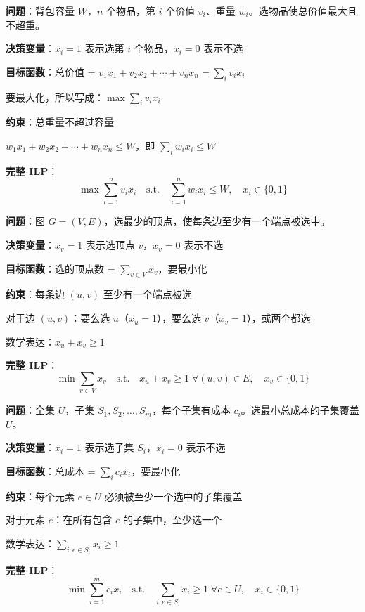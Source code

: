 \documentclass[12pt, a4paper]{ctexart}
\begin{document}
\begin{blackboard}

\textbf{问题}：背包容量 $W$，$n$ 个物品，第 $i$ 个价值 $v_i$、重量 $w_i$。选物品使总价值最大且不超重。

\textbf{决策变量}：$x_i = 1$ 表示选第 $i$ 个物品，$x_i = 0$ 表示不选

\textbf{目标函数}：总价值 = $v_1 x_1 + v_2 x_2 + \cdots + v_n x_n = \sum_i v_i x_i$

要最大化，所以写成：$\max \sum_i v_i x_i$

\textbf{约束}：总重量不超过容量

$w_1 x_1 + w_2 x_2 + \cdots + w_n x_n \leq W$，即 $\sum_i w_i x_i \leq W$

\textbf{完整 ILP}：
\[
\max \sum_{i=1}^n v_i x_i \quad \text{s.t.} \quad \sum_{i=1}^n w_i x_i \leq W, \quad x_i \in \{0, 1\}
\]

\end{blackboard}

\begin{blackboard}

\textbf{问题}：图 $G = (V, E)$，选最少的顶点，使每条边至少有一个端点被选中。

\textbf{决策变量}：$x_v = 1$ 表示选顶点 $v$，$x_v = 0$ 表示不选

\textbf{目标函数}：选的顶点数 = $\sum_{v \in V} x_v$，要最小化

\textbf{约束}：每条边 $(u, v)$ 至少有一个端点被选

对于边 $(u, v)$：要么选 $u$（$x_u = 1$），要么选 $v$（$x_v = 1$），或两个都选

数学表达：$x_u + x_v \geq 1$

\textbf{完整 ILP}：
\[
\min \sum_{v \in V} x_v \quad \text{s.t.} \quad x_u + x_v \geq 1 \; \forall (u,v) \in E, \quad x_v \in \{0, 1\}
\]

\end{blackboard}

\begin{blackboard}

\textbf{问题}：全集 $U$，子集 $S_1, S_2, \ldots, S_m$，每个子集有成本 $c_i$。选最小总成本的子集覆盖 $U$。

\textbf{决策变量}：$x_i = 1$ 表示选子集 $S_i$，$x_i = 0$ 表示不选

\textbf{目标函数}：总成本 = $\sum_i c_i x_i$，要最小化

\textbf{约束}：每个元素 $e \in U$ 必须被至少一个选中的子集覆盖

对于元素 $e$：在所有包含 $e$ 的子集中，至少选一个

数学表达：$\sum_{i: e \in S_i} x_i \geq 1$

\textbf{完整 ILP}：
\[
\min \sum_{i=1}^m c_i x_i \quad \text{s.t.} \quad \sum_{i: e \in S_i} x_i \geq 1 \; \forall e \in U, \quad x_i \in \{0, 1\}
\]

\end{blackboard}
\end{document}
